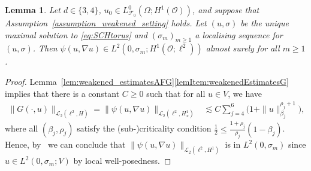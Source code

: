 \documentclass[reqno]{amsart}
\newtheorem{lemma}[Satz]{Lemma}
\newcommand{\F}{\mathscr{F}}
\newcommand{\sL}{\mathscr{L}}
\newcommand{\sO}{\mathscr{O}}
\newcommand{\1}{\mathbf{1}}
\newcommand{\grad}{\nabla}
\begin{document}
\begin{lemma}
\label{lem:noiseIsInH}
    Let $d\in \{3,4\}$, $u_0\in L^0_{\F_0}(\Omega;H^1(\sO))$, and suppose that Assumption~\ref{assumption_weakened_setting} holds. Let $(u,\sigma)$ be the unique maximal solution to \eqref{eq:SCHtorus} and $(\sigma_m)_{m\ge 1}$ a localising sequence for $(u,\sigma)$. Then $\psi(u,\grad u)\in L^2(0,\sigma_m;H^1(\sO;\ell^2))$ almost surely for all $m\ge 1$.
\end{lemma}
\begin{proof}
    Lemma~\ref{lem:weakened_estimatesAFG}\ref{lemItem:weakenedEstimatesG} implies
    that there is a constant $C\ge 0$ such that for all $u\in V$, we have
    \begin{align*}
         \| G(\cdot,u) \|_{\sL_2(\ell^2,H)}=\|\psi(u,\grad u)\|_{\sL_2(\ell^2,H_x^1)} &\lesssim C\sum_{j=4}^6 \big(1+\|u \|_{\beta_j}^{\rho_j+1}\big),
    \end{align*}
    where all $(\beta_j,\rho_j)$ satisfy the (sub-)criticality condition $\frac{1}{2}\le \frac{1+\rho_j}{\rho_j}(1-\beta_j)$. Hence, by~\cite[Remark~4.2]{agrestiNonlinearSPDEsMaximal2025} we can conclude that $\|\psi(u,\grad u)\|_{\sL_2(\ell^2,H^1)}$ is in $L^2(0,\sigma_m)$ since $u\in L^2(0,\sigma_m;V)$ by local well-posedness.   
\end{proof}
\end{document}
